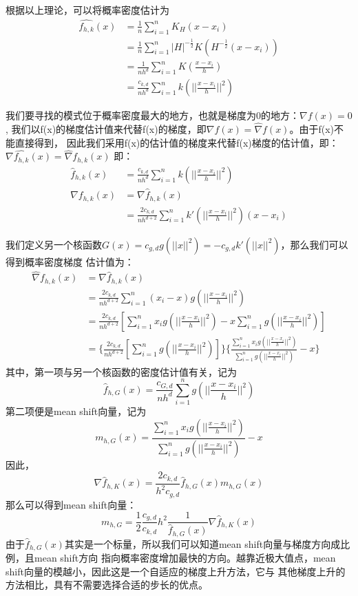 \documentclass{article}
\begin{document}
根据以上理论，可以将概率密度估计为
\begin{align}
    \hat{f_{h, k}} (x) &= \frac{1}{n} {\sum}_{i=1}^nK_H(x-x_i) \\
    &= \frac{1}{n} {\sum}_{i=1}^n |H|^{-\frac{1}{2}} K(H^{-\frac{1}{2}}(x-x_i)) \\
    &= \frac{1}{nh^d} {\sum}_{i=1}^n K(\frac{x-x_i}{h}) \\
    &= \frac{c_{k, d}}{nh^d} {\sum}_{i=1}^n k(||\frac{x-x_i}{h}||^2) 
\end{align}

我们要寻找的模式位于概率密度最大的地方，也就是梯度为0的地方：$ \nabla f(x) = 0 $,
我们以f(x)的梯度估计值来代替f(x)的梯度，即$ \nabla f(x) = \hat{\nabla} f(x) $。由于f(x)不能直接得到，
因此我们采用f(x)的估计值的梯度来代替f(x)梯度的估计值，即：$ \nabla \hat{f_{h, k}}(x) = \hat{\nabla} f_{h, k}(x) $
即：
\begin{align}
    \hat{f}_{h, k}(x) &= \frac{c_{k, d}}{nh^d}{\sum}_{i=1}^n k(||\frac{x-x_i}{h}||^2) \\
    \nabla f_{h, k}(x) &= \nabla \hat{f}_{h, k}(x) \\
    &= \frac{2c_{k, d}}{nh^{d+2}} {\sum}_{i=1}^n k'(||\frac{x-x_i}{h}||^2)(x-x_i) 
\end{align}

我们定义另一个核函数$ G(x) = c_{g, d}g(||x||^2) = - c_{g, d} k'(||x||^2) $，那么我们可以得到概率密度梯度
估计值为：
\begin{align}
    \hat{\nabla} f_{h, k}(x) &= \nabla \hat{f}_{h, k}(x) \\
    &= \frac{2c_{k, d}}{nh^{d+2}} {\sum}_{i=1}^n (x_i-x)g(||\frac{x-x_i}{h}||^2) \\
    &= \frac{2c_{k, d}}{nh^{d+2}} [{\sum}_{i=1}^n x_i g(||\frac{x-x_i}{h}||^2) - x{\sum}_{i=1}^n g(||\frac{x-x_i}{h}||^2)] \\
    &= \{\frac{2c_{k, d}}{nh^{d+2}}[{\sum}_{i=1}^ng(||\frac{x-x_i}{h}||^2)]\}\{\frac{{\sum}_{i=1}^nx_ig(||\frac{x-x_i}{h}||^2)}{{\sum}_{i=1}^ng(||\frac{x-x_i}{h}||^2)} - x\}
\end{align}
其中，第一项与另一个核函数的密度估计值有关，记为
\begin{equation}
    \hat{f}_{h, G}(x) = \frac{c_{G, d}}{nh^d} {\sum}_{i=1}^n g(||\frac{x-x_i}{h}||^2)
\end{equation}
第二项便是mean shift向量，记为
$$ 
m_{h, G}(x) = \frac{{\sum}_{i=1}^nx_ig(||\frac{x-x_i}{h}||^2)}{{\sum}_{i=1}^ng(||\frac{x-x_i}{h}||^2)} - x
$$
因此，
$$
\nabla \hat{f}_{h, K}(x) = \frac{2c_{k, d}}{h^2c_{g, d}} \hat{f}_{h, G}(x) m_{h, G}(x)
$$
那么可以得到mean shift向量：
$$
m_{h, G} = \frac{1}{2} \frac{c_{g, d}}{c_{k, d}} h^2 \frac{1}{\hat{f}_{h, G}(x)} \nabla \hat{f}_{h, K}(x)
$$
由于$ \hat{f}_{h, G}(x) $其实是一个标量，所以我们可以知道mean shift向量与梯度方向成比例，且mean shift方向
指向概率密度增加最快的方向。越靠近极大值点，mean shift向量的模越小，因此这是一个自适应的梯度上升方法，它与
其他梯度上升的方法相比，具有不需要选择合适的步长的优点。
\end{document}
